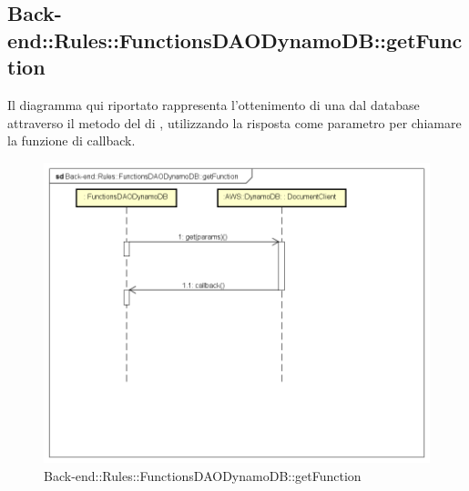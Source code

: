 \subsection{Back-end::Rules::FunctionsDAODynamoDB::getFunction}
Il diagramma qui riportato rappresenta l'ottenimento di una  dal database attraverso il metodo  del  di , utilizzando la risposta come parametro per chiamare la funzione di callback. 
\begin{figure}[h] \centering \includegraphics[width=\textwidth,height=\textheight,keepaspectratio]{images/diagrams/back-end/Ufficial_Backend/Back-endRulesFunctionsDAODynamoDBgetFunction.png} 	\caption{Back-end::Rules::FunctionsDAODynamoDB::getFunction}
\end{figure}
\newpage


